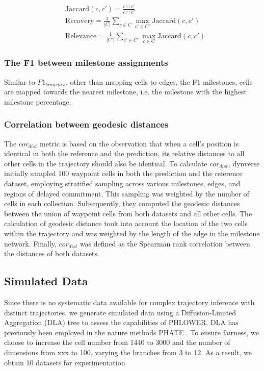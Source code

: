 \begin{equation}
\label{eqn:corrdist}
\begin{aligned}
& \text{Jaccard}(c, c')  = \frac{c\cup c'}{c\cap c'} \\
& \text{Recovery} = \frac{1}{|C|}\sum_{c\in C} \max_{c'\in C'} \text{Jaccard}(c, c') \\
& \text{Relevance} = \frac{1}{|C'|}\sum_{c' \in C'} \max_{c\in C} \text{Jaccard}(c, c')
\end{aligned}
\end{equation}

\subsubsection{The F1 between milestone assignments}
Similar to $F1_{branches}$, other than mapping cells to edges, the F1 milestones, cells are mapped towards the nearest milestone, i.e. the milestone with the highest milestone percentage.


\subsubsection{Correlation between geodesic distances}
The $cor_{dist}$ metric is based on the observation that when a cell's position is identical in both the reference and the prediction, its relative distances to all other cells in the trajectory should also be identical. To calculate $cor_{dist}$, dynverse initially sampled 100 waypoint cells in both the prediction and the reference dataset, employing stratified sampling across various milestones, edges, and regions of delayed commitment. This sampling was weighted by the number of cells in each collection. Subsequently, they computed the geodesic distances between the union of waypoint cells from both datasets and all other cells. The calculation of geodesic distance took into account the location of the two cells within the trajectory and was weighted by the length of the edge in the milestone network. Finally, $cor_{dist}$ was defined as the Spearman rank correlation between the distances of both datasets.


\subsection{Simulated Data}
Since there is no systematic data available for complex trajectory inference with distinct trajectories, we generate simulated data using a Diffusion-Limited Aggregation (DLA) tree to assess the capabilities of PHLOWER. DLA has previously been employed in the nature methods PHATE \citep{moon2017phate}. To ensure fairness, we choose to increase the cell number from 1440 to 3000 and the number of dimensions from xxx to 100, varying the branches from 3 to 12. As a result, we obtain 10 datasets for experimentation.

